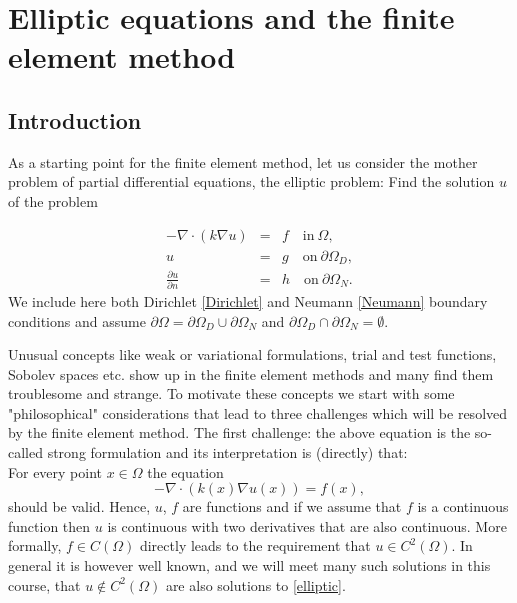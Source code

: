 \chapter{Elliptic equations and the finite element method}




\label{elliptic}
\section{Introduction}

As a starting point for the finite element method, let us
consider the mother problem of partial differential equations, 
the elliptic problem: Find the solution $u$ of the problem

\begin{eqnarray}
\label{elliptic}
-\nabla\cdot(k\nabla u)  &=& f \quad \textrm{in}\ \Omega,\\
\label{Dirichlet}
u&=& g \quad \textrm{on}\ \partial\Omega_D, \\
\label{Neumann}
\frac{\partial u}{\partial n}&=& h \quad \textrm{on}\ \partial\Omega_N . 
\end{eqnarray}
We include here both Dirichlet \eqref{Dirichlet} and Neumann \eqref{Neumann} boundary conditions
and assume $\partial \Omega = \partial \Omega_D \cup \partial \Omega_N$ 
and $\partial \Omega_D \cap \partial \Omega_N = \emptyset$.
 

Unusual concepts like weak or variational formulations, trial and test functions, Sobolev
spaces etc. show up in the finite element methods and many find them troublesome and strange. To motivate
these concepts we start with some "philosophical" considerations that lead to three challenges which 
will be resolved by the finite element method. The first challenge: the above equation is 
the so-called strong formulation and its interpretation is (directly) that: \\ 
For every point $x \in \Omega$ the equation 
\begin{equation}
\label{strong:elliptic}
-\nabla\cdot(k(x) \nabla u(x))  = f(x),  
\end{equation}
should be valid. Hence, $u$, $f$ are functions and
if we assume that $f$ is a continuous function then $u$ is continuous with two derivatives that are also continuous.   
More formally, $f\in C(\Omega)$ directly leads to the requirement that $u\in C^2(\Omega)$. In general 
it is however well known, and we will meet many such solutions in this course, that $u \not \in C^2(\Omega)$ are also
solutions to \eqref{elliptic}. 



